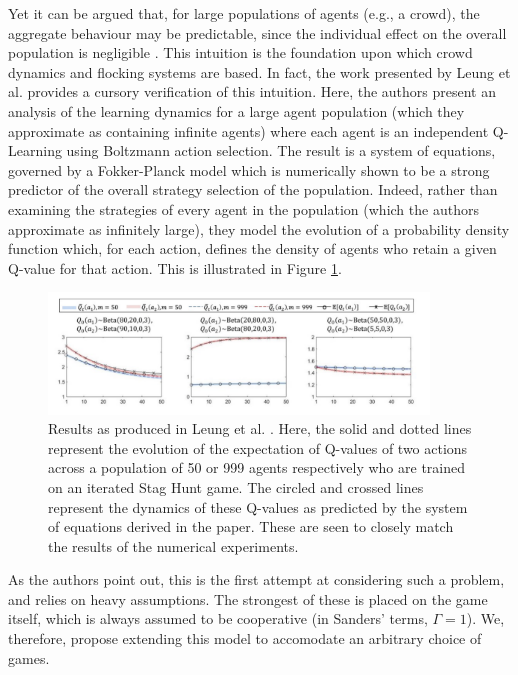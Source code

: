 \documentclass[.../main.tex]{subfiles}
\begin{document}
    Yet it can be argued that, for large populations of agents (e.g.,
    a crowd), the aggregate behaviour may be predictable, since the individual effect on the overall
    population is negligible \cite{Elamvazhuthi2019b}. This
    intuition is the foundation upon which crowd dynamics and flocking
    systems are based. In fact, the work presented by Leung et
    al. \cite{Hu2019} provides a cursory verification of this
    intuition. Here, the authors present an analysis of the learning
    dynamics for a large agent population (which they approximate as
    containing infinite agents) where each agent is an independent
    Q-Learning using Boltzmann action selection. The result is a
    system of equations, governed by a Fokker-Planck model which is
    numerically shown to be a strong predictor of the overall strategy
    selection of the population. Indeed, rather than examining the
    strategies of every agent in the population (which the authors
    approximate as infinitely large), they model the evolution of a
    probability density function which, for each action, defines the
    density of agents who retain a given Q-value for that action. This
    is illustrated in Figure \ref{fig::LeungPredictions}.

    \begin{figure}[h]
    	\centering
    	\includegraphics[width=0.9\textwidth]{Figures/LeungPredictions}
    	\caption{ \label{fig::LeungPredictions} Results as produced in Leung et al. \cite{Hu2019}.
    	Here, the solid and dotted lines represent the evolution of the expectation of Q-values of
    	two actions across a population of 50 or 999 agents respectively who are trained on an
    	iterated Stag Hunt game. The circled and crossed
    	lines represent the dynamics of these Q-values as predicted by the system of equations
    	derived in the paper. These are seen to closely match the results of the numerical
    	experiments.}
    \end{figure}

   	As the authors point out, this is the first attempt at considering such a problem, and relies on
	heavy assumptions. The strongest of these is placed on the game itself, which is always
	assumed to be cooperative (in Sanders' terms, $\Gamma = 1$). We, therefore, propose extending
	this model to accomodate an arbitrary choice of games. 
\end{document}
